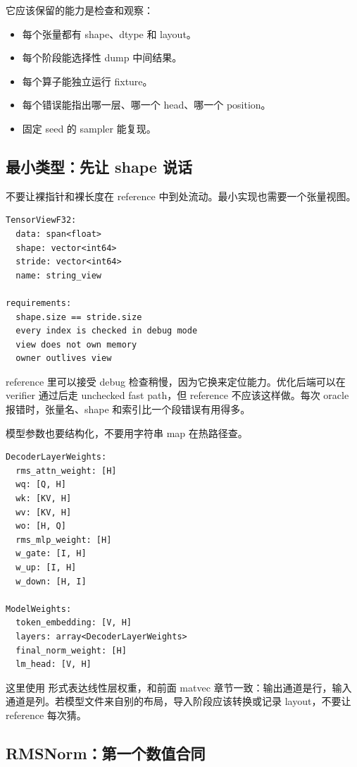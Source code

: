 它应该保留的能力是检查和观察：

\begin{itemize}
  \item 每个张量都有 shape、dtype 和 layout。
  \item 每个阶段能选择性 dump 中间结果。
  \item 每个算子能独立运行 fixture。
  \item 每个错误能指出哪一层、哪一个 head、哪一个 position。
  \item 固定 seed 的 sampler 能复现。
\end{itemize}

\subsection{最小类型：先让 shape 说话}

不要让裸指针和裸长度在 reference 中到处流动。最小实现也需要一个张量视图。

\begin{lstlisting}[numbers=none,caption={reference TensorView 的语义字段}]
TensorViewF32:
  data: span<float>
  shape: vector<int64>
  stride: vector<int64>
  name: string_view

requirements:
  shape.size == stride.size
  every index is checked in debug mode
  view does not own memory
  owner outlives view
\end{lstlisting}

reference 里可以接受 debug 检查稍慢，因为它换来定位能力。优化后端可以在 verifier 通过后走 unchecked fast path，但 reference 不应该这样做。每次 oracle 报错时，张量名、shape 和索引比一个段错误有用得多。

模型参数也要结构化，不要用字符串 map 在热路径查。

\begin{lstlisting}[numbers=none,caption={一层 decoder 的 reference 权重集合}]
DecoderLayerWeights:
  rms_attn_weight: [H]
  wq: [Q, H]
  wk: [KV, H]
  wv: [KV, H]
  wo: [H, Q]
  rms_mlp_weight: [H]
  w_gate: [I, H]
  w_up: [I, H]
  w_down: [H, I]

ModelWeights:
  token_embedding: [V, H]
  layers: array<DecoderLayerWeights>
  final_norm_weight: [H]
  lm_head: [V, H]
\end{lstlisting}

这里使用 \code{[out,in]} 形式表达线性层权重，和前面 matvec 章节一致：输出通道是行，输入通道是列。若模型文件来自别的布局，导入阶段应该转换或记录 layout，不要让 reference 每次猜。

\subsection{RMSNorm：第一个数值合同}


